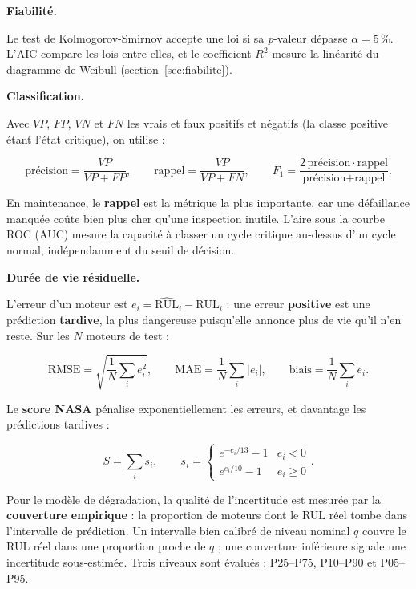 \textbf{Fiabilité.}

Le test de Kolmogorov-Smirnov accepte une loi si sa \emph{p}-valeur dépasse $\alpha = 5\,\%$. L'AIC compare les lois entre elles, et le coefficient $R^2$ mesure la linéarité du diagramme de Weibull (section~\ref{sec:fiabilite}).

\textbf{Classification.}

Avec $VP$, $FP$, $VN$ et $FN$ les vrais et faux positifs et négatifs (la classe positive étant l'état critique), on utilise :

\begin{equation}\label{eq:classif}
\text{précision} = \frac{VP}{VP + FP}, \qquad \text{rappel} = \frac{VP}{VP + FN}, \qquad F_1 = \frac{2\,\text{précision} \cdot \text{rappel}}{\text{précision} + \text{rappel}}.
\end{equation}

En maintenance, le \textbf{rappel} est la métrique la plus importante, car une défaillance manquée coûte bien plus cher qu'une inspection inutile. L'aire sous la courbe ROC (AUC) \cite{hanley1982} mesure la capacité à classer un cycle critique au-dessus d'un cycle normal, indépendamment du seuil de décision.

\textbf{Durée de vie résiduelle.}

L'erreur d'un moteur est $e_i = \widehat{\mathrm{RUL}}_i - \mathrm{RUL}_i$ : une erreur \textbf{positive} est une prédiction \textbf{tardive}, la plus dangereuse puisqu'elle annonce plus de vie qu'il n'en reste. Sur les $N$ moteurs de test :

\begin{equation}\label{eq:rmse}
\mathrm{RMSE} = \sqrt{\frac1N \sum_i e_i^2}, \qquad \mathrm{MAE} = \frac1N \sum_i |e_i|, \qquad \text{biais} = \frac1N \sum_i e_i .
\end{equation}

Le \textbf{score NASA} \cite{saxena2008damage} pénalise exponentiellement les erreurs, et davantage les prédictions tardives :

\begin{equation}\label{eq:score}
S = \sum_i s_i, \qquad s_i = \begin{cases} e^{-e_i/13} - 1 & e_i < 0 \\ e^{e_i/10} - 1 & e_i \ge 0 \end{cases}.
\end{equation}

Pour le modèle de dégradation, la qualité de l'incertitude est mesurée par la \textbf{couverture empirique} : la proportion de moteurs dont le RUL réel tombe dans l'intervalle de prédiction. Un intervalle bien calibré de niveau nominal $q$ couvre le RUL réel dans une proportion proche de $q$ ; une couverture inférieure signale une incertitude sous-estimée. Trois niveaux sont évalués : P25–P75, P10–P90 et P05–P95.

